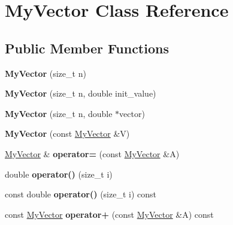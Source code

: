 \hypertarget{class_my_vector}{}\section{My\+Vector Class Reference}
\label{class_my_vector}
\subsection*{Public Member Functions}
\begin{DoxyCompactItemize}
\item 
\hypertarget{class_my_vector_a8b1c97ca44a90222aa9541cb76c2903a}{}{\bfseries My\+Vector} (size\+\_\+t n)\label{class_my_vector_a8b1c97ca44a90222aa9541cb76c2903a}

\item 
\hypertarget{class_my_vector_a41d73abf8719c3149bf5d0d7731d02d2}{}{\bfseries My\+Vector} (size\+\_\+t n, double init\+\_\+value)\label{class_my_vector_a41d73abf8719c3149bf5d0d7731d02d2}

\item 
\hypertarget{class_my_vector_a89360f5693b23f64f5f90ed371f5c6ec}{}{\bfseries My\+Vector} (size\+\_\+t n, double $\ast$vector)\label{class_my_vector_a89360f5693b23f64f5f90ed371f5c6ec}

\item 
\hypertarget{class_my_vector_a0e9295e78e9bfff24c59a43f7485eebf}{}{\bfseries My\+Vector} (const \hyperlink{class_my_vector}{My\+Vector} \&V)\label{class_my_vector_a0e9295e78e9bfff24c59a43f7485eebf}

\item 
\hypertarget{class_my_vector_aa4c0e3325e01d1b79ea2da16b556e3e8}{}\hyperlink{class_my_vector}{My\+Vector} \& {\bfseries operator=} (const \hyperlink{class_my_vector}{My\+Vector} \&A)\label{class_my_vector_aa4c0e3325e01d1b79ea2da16b556e3e8}

\item 
\hypertarget{class_my_vector_aa3ff877b4e0e176368b623c4d37d964a}{}double {\bfseries operator()} (size\+\_\+t i)\label{class_my_vector_aa3ff877b4e0e176368b623c4d37d964a}

\item 
\hypertarget{class_my_vector_a0e7706e269cd45ea58bcc98776a3e7dc}{}const double {\bfseries operator()} (size\+\_\+t i) const \label{class_my_vector_a0e7706e269cd45ea58bcc98776a3e7dc}

\item 
\hypertarget{class_my_vector_a7e39b30f1b251bc7e3dc2becaad36c1c}{}const \hyperlink{class_my_vector}{My\+Vector} {\bfseries operator+} (const \hyperlink{class_my_vector}{My\+Vector} \&A) const \label{class_my_vector_a7e39b30f1b251bc7e3dc2becaad36c1c}


\end{DoxyCompactItemize}
